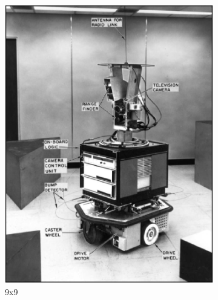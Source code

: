 \documentclass[lettersize,journal]{IEEEtran}
\begin{document}
\begin{figure}[h]
\begin{subfigure}[h]{0.115\textwidth}
        \includegraphics[width=\linewidth]{gaussian_map_9x9_sigma_1}
        \caption{9x9}  
    \end{subfigure}
    \begin{subfigure}[h]{0.115\textwidth}
        \centering 

\end{subfigure}
\end{figure}
\end{document}
